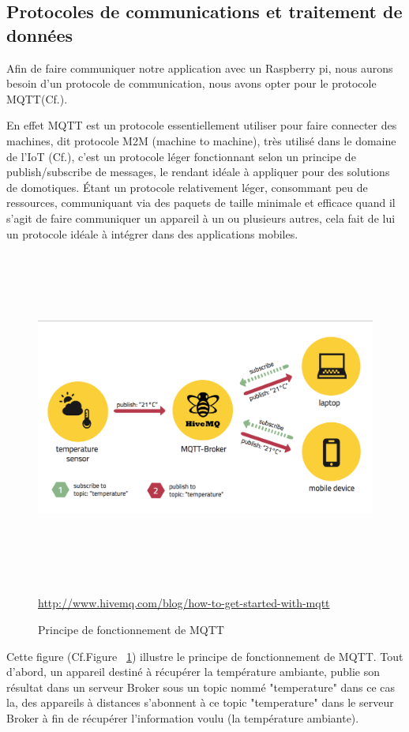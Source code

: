 \documentclass[12pt,a4paper]{article}
\begin{document}
\subsection{Protocoles de communications et traitement de données}
Afin de faire communiquer notre application avec un Raspberry pi, nous aurons besoin d'un protocole de communication, nous avons opter pour le protocole MQTT(Cf.\cite{Ref21}).\par
En effet MQTT est un protocole essentiellement utiliser pour faire connecter des machines, dit protocole M2M (machine to machine), très utilisé dans le domaine de l'IoT (Cf.\cite{Ref27}), c'est un protocole léger fonctionnant selon un principe de publish/subscribe de messages, le rendant idéale à appliquer pour des solutions de domotiques. Étant un protocole relativement léger, consommant peu de ressources, communiquant via des paquets de taille minimale et efficace quand il s'agit de faire communiquer un appareil à un ou plusieurs autres, cela fait de lui un protocole idéale à intégrer dans des applications mobiles.\par 

\begin{figure}[H]
  \centering
    \includegraphics[width = 15cm,height=11cm]{mqtt_design.png}
     \caption{Principe de fonctionnement de MQTT}
     \href{url}{http://www.hivemq.com/blog/how-to-get-started-with-mqtt  }
     \label{prototype}
\end{figure}

	Cette figure (Cf.Figure ~\ref{prototype})	 illustre le principe de fonctionnement de MQTT. Tout d'abord, un appareil destiné à récupérer la température ambiante, publie son résultat dans un serveur Broker sous un topic nommé "temperature" dans ce cas la, des appareils à distances s'abonnent à ce topic "temperature" dans le serveur Broker à fin de récupérer l'information voulu (la température ambiante).\par
    
\end{document}
